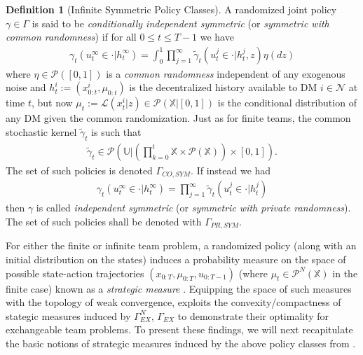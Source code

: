 \documentclass[12pt, oneside]{report}
\newcommand{\mbb}[1]{\mathbb{#1}}
\newcommand{\1}[1]{\mathbbm{1}_{\{#1\}}}
\newcommand{\mc}[1]{\mathcal{#1}}
\theoremstyle{definition}
\newtheorem{definition}[theorem]{Definition}
\begin{document}
\begin{definition}[Infinite Symmetric Policy Classes]\label{def33}
    A randomized joint policy $\gamma\in\Gamma$ is said to be \textit{conditionally independent symmetric} (or \textit{symmetric with common randomness}) if for all $0\leq t\leq T-1$
    we have
    \begin{align*}
        \gamma_t(u^\infty_t\in\cdot|h^\infty_t)=\int_0^1\prod_{j=1}^\infty\widetilde{\gamma}_t(u^j_t\in\cdot|h^j_t,z)\eta(dz)
    \end{align*}
    where $\eta\in\mc{P}([0,1])$ is a \textit{common randomness} independent of any exogenous noise and $h^i_t:=(x^i_{0:t},\mu_{0:t})$ 
    is the decentralized history available to DM $i\in\mc{N}$ at time $t$, but now $\mu_t:=\mc{L}(x^i_t|z)\in\mc{P}(\mbb{X}|[0,1])$ is the conditional
    distribution of any DM given the common randomization. Just as for finite teams, the common stochastic kernel $\widetilde{\gamma}_t$ is such that
    \begin{align*}
        \widetilde{\gamma}_t\in\mc{P}\left(\mbb{U}\bigg|\left(\prod_{k=0}^t\mbb{X}\times\mc{P}(\mbb{X})\right)\times[0,1]\right).
    \end{align*}
    The set of such policies is denoted $\Gamma_{CO,\mathit{SYM}}$. If instead we had
    \begin{align*}
        \gamma_t(u^\infty_t\in\cdot|h^\infty_t)=\prod_{j=1}^\infty\widetilde{\gamma}_t(u^j_t\in\cdot|h^j_t)
    \end{align*}
    then $\gamma$ is called \textit{independent symmetric} (or \textit{symmetric with private randomness}). The set of such policies shall be denoted with $\Gamma_{PR,\mathit{SYM}}$.
\end{definition}
For either the finite or infinite team problem, a randomized policy (along with
an initial distribution on the states) induces a probability measure on the
space of possible state-action trajectories $(x_{0:T},\mu_{0:T},u_{0:T-1})$
(where $\mu_t\in\mc{P}^N(\mbb{X})$ in the finite case) known as a
\textit{strategic measure} \cite{Yüksel_Saldi_2017}. Equipping the space of such
measures with the topology of weak convergence, \cite{Sanjari_Saldi_Yüksel_2024}
exploits the convexity/compactness of stategic measures induced by
$\Gamma^N_{EX}$, $\Gamma_{EX}$ to demonstrate their optimality for exchangeable
team problems. To present these findings, we will next recapitulate the basic
notions of strategic measures induced by the above policy classes from
\cite[\S5]{Sanjari_Saldi_Yüksel_2024}.
\end{document}
